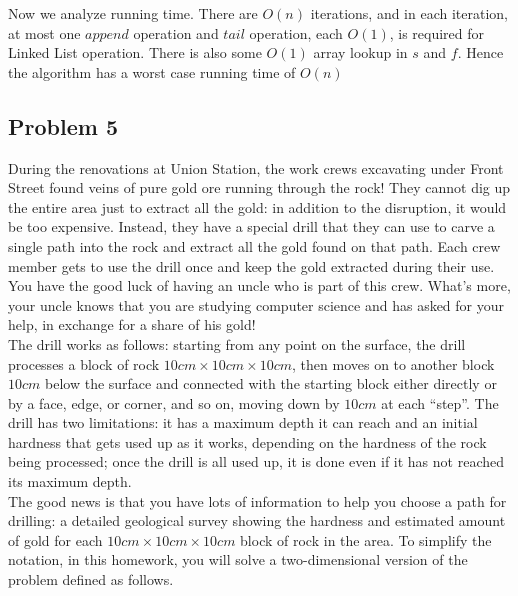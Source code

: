 \documentclass[11pt]{article}
\begin{document}
\begin{enumerate}
   Now we analyze running time. There are $O(n)$ iterations, and in each iteration, at most one $append$ operation and $tail$ operation, each $O(1)$, is required for Linked List operation. There is also some $O(1)$ array lookup in $s$ and $f$. Hence the algorithm has a worst case running time of $O(n)$



\end{enumerate}


\subsection*{Problem 5}
During the renovations at Union Station, the work crews excavating under Front Street found veins of pure gold ore running through the rock! They cannot dig up the entire area just to extract all the gold: in addition to the disruption, it would be too expensive. Instead, they have a special drill that they can use to carve a single path into the rock and extract all the gold found on that path. Each crew member gets to use the drill once and keep the gold extracted during their use. You have the good luck of having an uncle who is part of this crew. What’s more, your uncle knows that you are studying computer science and has asked for your help, in exchange for a share of his gold! \\
The drill works as follows: starting from any point on the surface, the drill processes a block of rock $10cm \times 10cm \times 10cm$, then moves on to another block $10cm$ below the surface and connected with the starting block either directly or by a face, edge, or corner, and so on, moving down by $10cm$ at each “step”. The drill has two limitations: it has a maximum depth it can reach and an initial hardness that gets used up as it works, depending on the hardness of the rock being processed; once the drill is all used up, it is done even if it has not reached its maximum depth. \\
The good news is that you have lots of information to help you choose a path for drilling: a detailed geological survey showing the hardness and estimated amount of gold for each $10cm \times 10cm \times 10cm$ block of rock in the area. To simplify the notation, in this homework, you will solve a two-dimensional version of the problem defined as follows.
\end{document}
